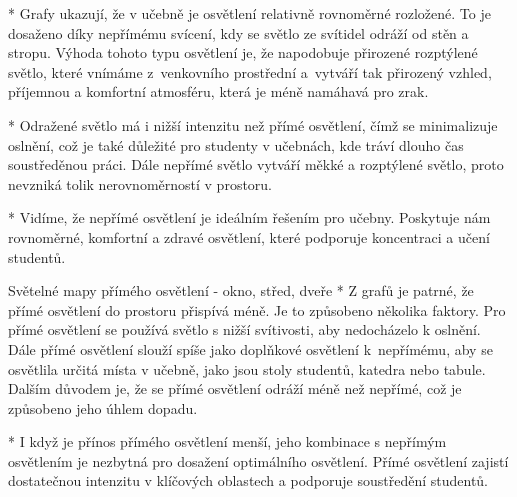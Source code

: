 \begitems
    * Grafy ukazují, že v učebně je osvětlení relativně rovnoměrné rozložené.
    To je dosaženo díky nepřímému svícení, kdy se světlo ze svítidel odráží od stěn a stropu.
    Výhoda tohoto typu osvětlení je, že napodobuje přirozené rozptýlené světlo, které vnímáme z~venkovního prostřední
    a~vytváří tak přirozený vzhled, příjemnou a komfortní atmosféru, která je méně namáhavá pro zrak.

    * Odražené světlo má i nižší intenzitu než přímé osvětlení, čímž se minimalizuje oslnění, což je také důležité pro
    studenty v učebnách, kde tráví dlouho čas soustředěnou práci.
    Dále nepřímé světlo vytváří měkké a rozptýlené světlo, proto nevzniká tolik nerovnoměrností v prostoru.

    * Vidíme, že nepřímé osvětlení je ideálním řešením pro učebny. Poskytuje nám rovnoměrné,
    komfortní a zdravé osvětlení, které podporuje koncentraci a učení studentů.
\enditems

\medskip {} Světelné mapy přímého osvětlení - okno, střed, dveře
\begitems
  *  Z grafů je patrné, že přímé osvětlení do prostoru přispívá méně. Je to způsobeno několika faktory.
    Pro přímé osvětlení se používá světlo s nižší svítivosti, aby nedocházelo k oslnění.
    Dále přímé osvětlení slouží spíše jako doplňkové osvětlení k~nepřímému, aby se osvětlila určitá místa v učebně,
    jako jsou stoly studentů, katedra nebo tabule. Dalším důvodem je, že se přímé osvětlení odráží
    méně než nepřímé, což je způsobeno jeho úhlem dopadu.

  *  I když je přínos přímého osvětlení menší, jeho kombinace s nepřímým osvětlením je nezbytná pro dosažení
    optimálního osvětlení. Přímé osvětlení zajistí dostatečnou intenzitu v klíčových oblastech a podporuje soustředění studentů.
\enditems





